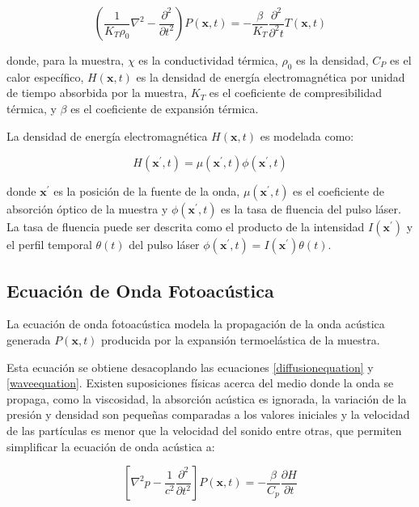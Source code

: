 \begin{equation}
    (\frac{1}{K_{T}\rho_{0}}\nabla^2 - \frac{\partial^2}{\partial t^2})P(\mathbf{x}, t) = -\frac{\beta}{K_{T}}\frac{\partial^2}{\partial^2 t}T(\mathbf{x}, t)
    \label{waveequation}
\end{equation}

donde, para la muestra, $\chi$ es la conductividad térmica, $\rho_{0}$ es la densidad, $C_{P}$ es el calor específico, $H(\mathbf{x}, t)$ es la densidad de energía electromagnética por unidad de tiempo absorbida por la muestra, $K_{T}$ es el coeficiente de compresibilidad térmica, y $\beta$ es el coeficiente de expansión térmica.

La densidad de energía electromagnética $H(\mathbf{x}, t)$ es modelada como:

\begin{equation}
    H({\mathbf{x}^{\prime}}, t) = \mu({\mathbf{x}^{\prime}}, t)\phi({\mathbf{x}^{\prime}}, t)
\end{equation}

donde $\mathbf{x}^{\prime}$ es la posición de la fuente de la onda, $\mu(\mathbf{x}^{\prime}, t)$ es el coeficiente de absorción óptico de la muestra y $\phi(\mathbf{x}^{\prime}, t)$ es la tasa de fluencia del pulso láser. La tasa de fluencia puede ser descrita como el producto de la intensidad $I(\mathbf{x}^{\prime})$ y el perfil temporal $\theta(t)$ del pulso láser $\phi(\mathbf{x}^{\prime}, t) = I(\mathbf{x}^{\prime})\theta(t)$.

\subsection{Ecuación de Onda Fotoacústica}
La ecuación de onda fotoacústica modela la propagación de la onda acústica generada $P(\mathbf{x}, t)$ producida por la expansión termoelástica de la muestra.

Esta ecuación se obtiene desacoplando las ecuaciones \ref{diffusionequation} y \ref{waveequation}. Existen suposiciones físicas acerca del medio donde la onda se propaga, como la viscosidad, la absorción acústica es ignorada, la variación de la presión y densidad son pequeñas comparadas a los valores iniciales y la velocidad de las partículas es menor que la velocidad del sonido entre otras, que permiten simplificar la ecuación de onda acústica a:

\begin{equation}
    \left[\nabla^2 p - \frac{1}{c^2}\frac{\partial^2 }{\partial t^2}\right]P(\mathbf{x}, t) = -\frac{\beta}{C_p}\frac{\partial H}{\partial t}
\end{equation}

